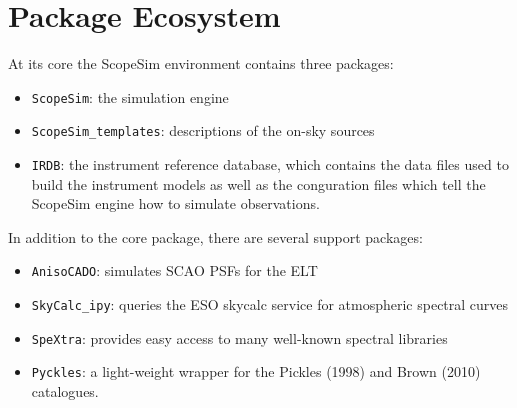 

\section{Package Ecosystem%
  \label{package-ecosystem}%
}


At its core the ScopeSim environment contains three packages:

\begin{itemize}
\item \texttt{ScopeSim}: the simulation engine

\item \texttt{ScopeSim\_templates}: descriptions of the on-sky sources

\item \texttt{IRDB}: the instrument reference database, which contains the data files used to build the instrument models as well as the conguration files which tell the ScopeSim engine how to simulate observations.
\end{itemize}

In addition to the core package, there are several support packages:

\begin{itemize}
\item \texttt{AnisoCADO}: simulates SCAO PSFs for the ELT

\item \texttt{SkyCalc\_ipy}: queries the ESO skycalc service for atmospheric spectral curves

\item \texttt{SpeXtra}: provides easy access to many well-known spectral libraries

\item \texttt{Pyckles}: a light-weight wrapper for the Pickles (1998) and Brown (2010) catalogues.
\end{itemize}

